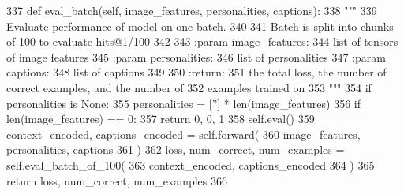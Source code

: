 \begin{DoxyCode}
337     \textcolor{keyword}{def }eval\_batch(self, image\_features, personalities, captions):
338         \textcolor{stringliteral}{"""}
339 \textcolor{stringliteral}{        Evaluate performance of model on one batch.}
340 \textcolor{stringliteral}{}
341 \textcolor{stringliteral}{        Batch is split into chunks of 100 to evaluate hits@1/100}
342 \textcolor{stringliteral}{}
343 \textcolor{stringliteral}{        :param image\_features:}
344 \textcolor{stringliteral}{            list of tensors of image features}
345 \textcolor{stringliteral}{        :param personalities:}
346 \textcolor{stringliteral}{            list of personalities}
347 \textcolor{stringliteral}{        :param captions:}
348 \textcolor{stringliteral}{            list of captions}
349 \textcolor{stringliteral}{}
350 \textcolor{stringliteral}{        :return:}
351 \textcolor{stringliteral}{            the total loss, the number of correct examples, and the number of}
352 \textcolor{stringliteral}{            examples trained on}
353 \textcolor{stringliteral}{        """}
354         \textcolor{keywordflow}{if} personalities \textcolor{keywordflow}{is} \textcolor{keywordtype}{None}:
355             personalities = [\textcolor{stringliteral}{''}] * len(image\_features)
356         \textcolor{keywordflow}{if} len(image\_features) == 0:
357             \textcolor{keywordflow}{return} 0, 0, 1
358         self.eval()
359         context\_encoded, captions\_encoded = self.forward(
360             image\_features, personalities, captions
361         )
362         loss, num\_correct, num\_examples = self.eval\_batch\_of\_100(
363             context\_encoded, captions\_encoded
364         )
365         \textcolor{keywordflow}{return} loss, num\_correct, num\_examples
366 
\end{DoxyCode}
\mbox{\label{classprojects_1_1personality__captions_1_1transresnet_1_1modules_1_1TransresnetModel_a0d96cec932912a3e06a44dc95259010a}} 
